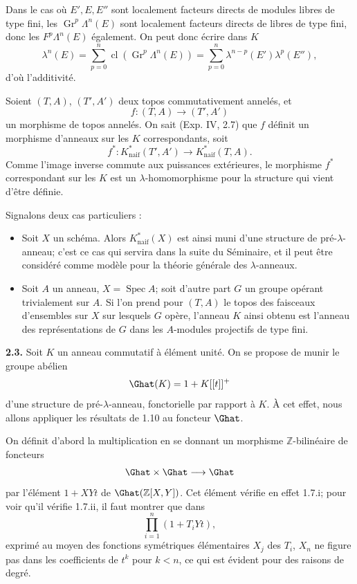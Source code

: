 \documentclass[11pt]{article}
\begin{document}
Dans le cas où \(E',E,E''\) sont localement facteurs directs de modules libres de type fini, les \(\operatorname{Gr}^p\Lambda^n(E)\) sont localement facteurs directs de libres de type fini, donc les \(F^p\Lambda^n(E)\) également. On peut donc écrire dans \(K\)
\[
  \lambda^n(E)=\sum_{p=0}^{n}\operatorname{cl}(\operatorname{Gr}^p\Lambda^n(E))
  =
  \sum_{p=0}^{n}\lambda^{n-p}(E')\lambda^p(E''),
\]
d'où l'additivité.

Soient \((T,A)\), \((T',A')\) deux topos commutativement annelés, et
\[
  f:(T,A)\longrightarrow(T',A')
\]
un morphisme de topos annelés. On sait (Exp. IV, 2.7) que \(f\) définit un morphisme d'anneaux sur les \(K\) correspondants, soit
\[
  f^*:K^*_{\mathrm{naif}}(T',A')\longrightarrow K^*_{\mathrm{naif}}(T,A).
\]
Comme l'image inverse commute aux puissances extérieures, le morphisme \(f^*\) correspondant sur les \(K\) est un \(\lambda\)-homomorphisme pour la structure qui vient d'être définie.

Signalons deux cas particuliers :
\begin{itemize}
\item Soit \(X\) un schéma. Alors \(K^*_{\mathrm{naif}}(X)\) est ainsi muni d'une structure de pré-\(\lambda\)-anneau; c'est ce cas qui servira dans la suite du Séminaire, et il peut être considéré comme modèle pour la théorie générale des \(\lambda\)-anneaux.
\item Soit \(A\) un anneau, \(X=\operatorname{Spec}A\); soit d'autre part \(G\) un groupe opérant trivialement sur \(A\). Si l'on prend pour \((T,A)\) le topos des faisceaux d'ensembles sur \(X\) sur lesquels \(G\) opère, l'anneau \(K\) ainsi obtenu est l'anneau des représentations de \(G\) dans les \(A\)-modules projectifs de type fini.
\end{itemize}

\textbf{2.3.} Soit \(K\) un anneau commutatif à élément unité. On se propose de munir le groupe abélien
\[
  \Ghat(K)=1+K[[t]]^+
\]
d'une structure de pré-\(\lambda\)-anneau, fonctorielle par rapport à \(K\). À cet effet, nous allons appliquer les résultats de 1.10 au foncteur \(\Ghat\).

On définit d'abord la multiplication en se donnant un morphisme \(\mathbb Z\)-bilinéaire de foncteurs
\[
  \Ghat\times\Ghat\longrightarrow\Ghat
\]
par l'élément \(1+XYt\) de \(\Ghat(\mathbb Z[X,Y])\). Cet élément vérifie en effet 1.7.i; pour voir qu'il vérifie 1.7.ii, il faut montrer que dans
\[
  \prod_{i=1}^{n}(1+T_iYt),
\]
exprimé au moyen des fonctions symétriques élémentaires \(X_j\) des \(T_i\), \(X_n\) ne figure pas dans les coefficients de \(t^k\) pour \(k<n\), ce qui est évident pour des raisons de degré.
\end{document}
